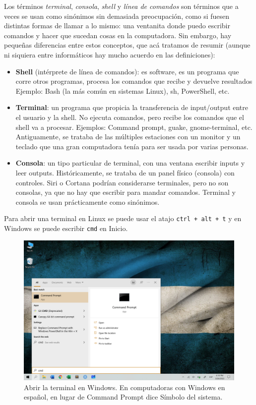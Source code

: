 \documentclass[
]{book}
\providecommand{\tightlist}{%
  \setlength{\itemsep}{0pt}\setlength{\parskip}{0pt}}
\begin{document}
Los términos \emph{terminal}, \emph{consola}, \emph{shell} y \emph{línea de comandos} son términos que a veces se usan como sinónimos sin demasiada preocupación, como si fuesen distintas formas de llamar a lo mismo: una ventanita donde puedo escribir comandos y hacer que sucedan cosas en la computadora. Sin embargo, hay pequeñas diferencias entre estos conceptos, que acá tratamos de resumir (aunque ni siquiera entre informáticos hay mucho acuerdo en las definiciones):

\begin{itemize}
\tightlist
\item
  \textbf{Shell} (intérprete de línea de comandos): es software, es un programa que corre otros programas, procesa los comandos que recibe y devuelve resultados Ejemplo: Bash (la más común en sistemas Linux), sh, PowerShell, etc.
\item
  \textbf{Terminal}: un programa que propicia la transferencia de input/output entre el usuario y la shell. No ejecuta comandos, pero recibe los comandos que el shell va a procesar. Ejemplos: Command prompt, guake, gnome-terminal, etc. Antiguamente, se trataba de las múltiples estaciones con un monitor y un teclado que una gran computadora tenía para ser usada por varias personas.
\item
  \textbf{Consola}: un tipo particular de terminal, con una ventana escribir inputs y leer outputs. Históricamente, se trataba de un panel físico (consola) con controles. Siri o Cortana podrían considerarse terminales, pero no son consolas, ya que no hay que escribir para mandar comandos. Terminal y consola se usan prácticamente como sinónimos.
\end{itemize}

Para abrir una terminal en Linux se puede usar el atajo \texttt{ctrl\ +\ alt\ +\ t} y en Windows se puede escribir \texttt{cmd} en Inicio.

\begin{figure}

{\centering \includegraphics[width=0.8\linewidth]{images/07_otros/terminal} 

}

\caption{Abrir la terminal en Windows. En computadoras con Windows en español, en lugar de Command Prompt dice Símbolo del sistema.}\label{fig:unnamed-chunk-106}
\end{figure}
\end{document}
